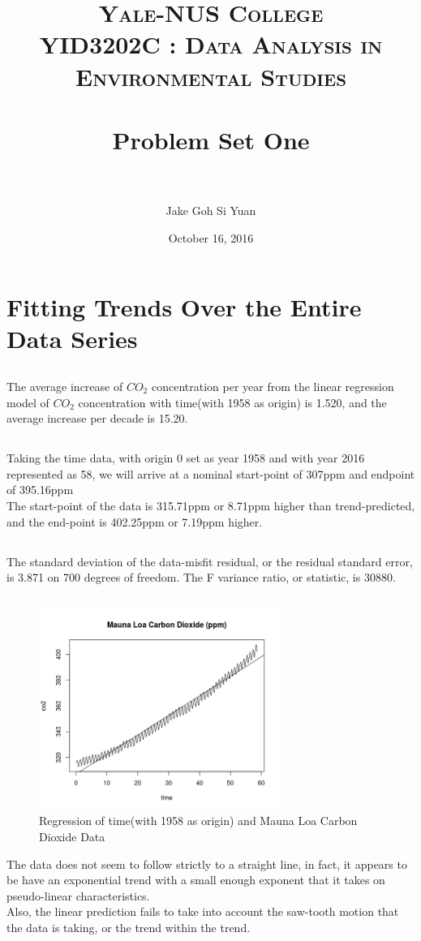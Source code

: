 \documentclass[paper=a4, fontsize=11pt]{scrartcl}
\title{	
\normalfont \normalsize 
\textsc{Yale-NUS College} \\ [20pt]
\textsc{YID3202C : Data Analysis in Environmental Studies } \\ [25pt] %
\horrule{0.5pt} \\[0.4cm] %
\huge Problem Set One \\ %
\horrule{2pt} \\[0.5cm] %
}
\author{Jake Goh Si Yuan} %
\date{\normalsize October 16, 2016} %
\numberwithin{equation}{section} %
\numberwithin{figure}{section} %
\numberwithin{table}{section} %
\begin{document}
\maketitle %
\section{Fitting Trends Over the Entire Data Series}
\subsection{}
The average increase of $CO_2$ concentration per year from the linear regression model of $CO_2$ concentration with time(with 1958 as origin) is 1.520, and the average increase per decade is 15.20.

\subsection{}
Taking the time data, with origin 0 set as year 1958 and with year 2016 represented as 58, we will arrive at a nominal start-point of 307ppm and endpoint of 395.16ppm\\

The start-point of the data is 315.71ppm or 8.71ppm higher than trend-predicted, and the end-point is 402.25ppm or 7.19ppm higher.
\subsection{}

The standard deviation of the data-misfit residual, or the residual standard error, is 3.871 on 700 degrees of freedom. The F variance ratio, or statistic, is 30880.
\pagebreak
\subsection{}
\begin{figure}[htp]
	\centering
	\includegraphics[width=0.7\textwidth, clip]{q1aTime.png} 
	\caption{Regression of time(with 1958 as origin) and Mauna Loa Carbon Dioxide Data}
\end{figure}

The data does not seem to follow strictly to a straight line, in fact, it appears to be have an exponential trend with a small enough exponent that it takes on pseudo-linear characteristics.\\

Also, the linear prediction fails to take into account the saw-tooth motion that the data is taking, or the trend within the trend.
\end{document}
